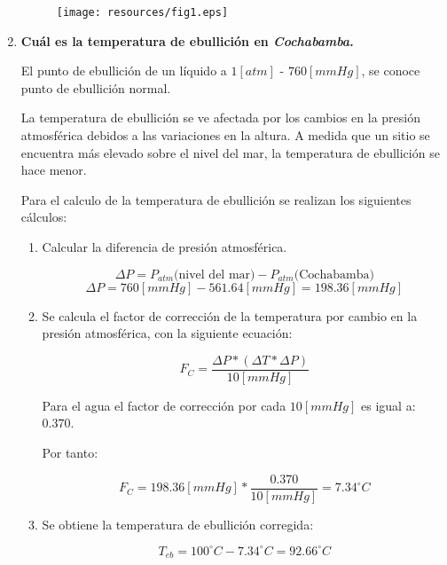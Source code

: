 \documentclass[letter,11pt]{article}
\begin{document}
\begin{enumerate}
\begin{figure}[!h]
\centering
\texttt{[image: resources/fig1.eps]}
\end{figure}

\item \textbf{Cuál es la temperatura de ebullición en \emph{Cochabamba}.}

El punto de ebullición de un líquido a $1 [atm]$ - $760 [mmHg]$, se conoce punto
de ebullición normal.

La temperatura de ebullición se ve afectada por los cambios en la presión
atmosférica debidos a las variaciones en la altura. A medida que un sitio se
encuentra más elevado sobre el nivel del mar, la temperatura de ebullición se
hace menor.

Para el calculo de la temperatura de ebullición se realizan los siguientes
cálculos:

\begin{enumerate}
\item Calcular la diferencia de presión atmosférica.

\begin{equation*}
\Delta P = P_{atm} \text{(nivel del mar)} - P_{atm} \text{(Cochabamba)}
\end{equation*}
\begin{equation*}
\Delta P = 760 [mmHg] - 561.64 [mmHg] = 198.36 [mmHg]
\end{equation*}

\item Se calcula el factor de corrección de la temperatura por cambio en la
presión atmosférica, con la siguiente ecuación:

\begin{equation*}
F_C = \frac{\Delta P * (\Delta T * \Delta P)}{10 [mmHg]}
\end{equation*}

Para el agua el factor de corrección por cada $10 [mmHg]$ es igual a: $0.370$.

Por tanto:

\begin{equation*}
F_C = 198.36 [mmHg] * \frac{0.370}{10 [mmHg]} = 7.34 ^\circ C
\end{equation*}

\item Se obtiene la temperatura de ebullición corregida:

\begin{equation*}
T_{eb} = 100 ^\circ C - 7.34 ^\circ C = 92.66 ^\circ C
\end{equation*}

\end{enumerate}

\end{enumerate}
\end{document}
